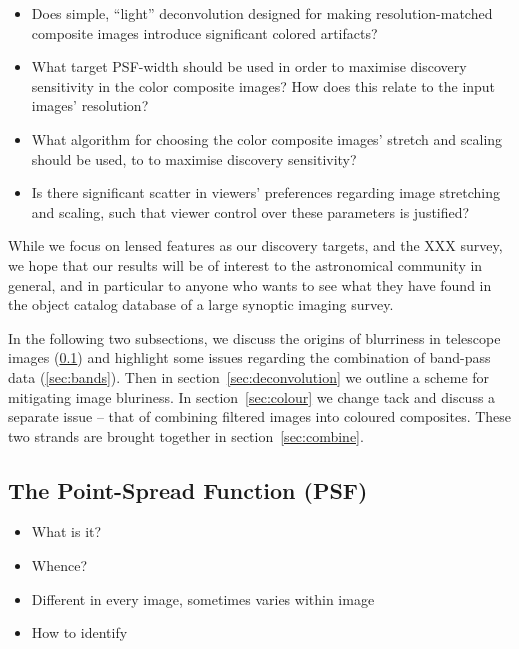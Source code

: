 \documentclass[letterpaper, 11pt]{article}
\begin{document}
\begin{itemize}

	\item Does simple, ``light'' deconvolution designed for making
resolution-matched composite images introduce significant colored artifacts?

	\item What target PSF-width should be used in order to
maximise discovery sensitivity in the color composite images? How does this
relate to the input images' resolution?

	\item What algorithm for choosing the color composite images' stretch and
scaling should be used, to to maximise discovery sensitivity? 

	\item Is there significant scatter in viewers' preferences regarding image
stretching and scaling, such that viewer control over these parameters is
justified?

\end{itemize}

While we focus on lensed features as our discovery targets, and the XXX
survey, we hope that our results will be of interest to the astronomical
community in general, and in particular to anyone who wants to see what they
have found in the object catalog database of a large synoptic imaging survey.

In the following two subsections, we discuss the origins of blurriness in telescope images (\ref{sec:psf}) and highlight some issues regarding the combination of band-pass data (\ref{sec:bands}). Then in section~\ref{sec:deconvolution} we outline a scheme for mitigating image bluriness. In section~\ref{sec:colour} we change tack and discuss a separate issue -- that of combining filtered images into coloured composites. These two strands are brought together in section~\ref{sec:combine}.


\subsection{The Point-Spread Function (PSF)}
\label{sec:psf}

\begin{itemize}
	\item What is it?
	\item Whence?
	\item Different in every image, sometimes varies within image	
	\item How to identify
\end{itemize}
\end{document}
